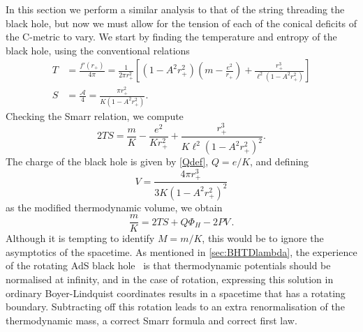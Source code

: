 \documentclass[
twoside,
openright,
frontopenright,
]{dmathesis}
\newcommand{\nn}{\nonumber}
\begin{document}
In this section we perform a similar analysis to that of the string threading the 
black hole, but now we must allow for the tension of each of the conical deficits
of the C-metric to vary.
We start by finding the temperature and entropy of the black hole, using
the conventional relations
\begin{align}
  \label{eq:TSNR}
T &= \frac{f'(r_+)}{4\pi} = \frac{1}{2\pi r_+^2} \left [ (1-A^2 r_+^2) \left (
m - \frac{e^2}{r_+}\right) + \frac{r_+^3}{\ell^2(1-A^2 r_+^2)} \right]\nn\\
S &= \frac{\mathcal{A}}{4} =\frac{\pi r_+^2}{K(1-A^2 r_+^2)}.
\end{align}
Checking the Smarr relation, we compute
\begin{equation}
2TS = \frac{m}{K} - \frac{e^2}{K r_+^2} + \frac{r_+^3}{K\ell^2(1-A^2 r_+^2)^2}.
\end{equation}
The charge of the black hole is given by \cref{Qdef}, $Q = e/K$, and defining 
\begin{equation}
  \label{eq:volNR}
V  = \frac{4\pi r_+^3}{3K(1-A^2r_+^2)^2}
\end{equation}
as the modified thermodynamic volume, we obtain
\begin{equation}
\frac{m}{K} = 2 TS  + Q\Phi_H - 2 PV\,.
\end{equation}
Although it is tempting to identify $M=m/K$, this would be to ignore the
asymptotics of the spacetime. As mentioned in \cref{sec:BHTDlambda}, the
experience of the rotating AdS black
hole~\cite{Caldarelli:1999xj,Gibbons:2004ai} is that thermodynamic potentials
should be normalised at infinity, and in the case of rotation, expressing this
solution in ordinary Boyer-Lindquist coordinates results in a spacetime that has
a rotating boundary. Subtracting off this rotation leads to an extra
renormalisation of the thermodynamic mass, a correct Smarr formula and correct
first law. 
\end{document}
